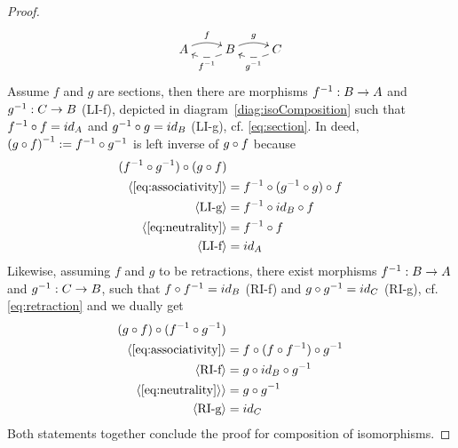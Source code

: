 \begin{proof}
\begin{equation}
\label{diag:isoComposition}
\xymatrix{
A \ar@/^/[r]^f & B \ar@/^/[r]^g \ar@{-->}@/^/[l]^{f^{-1}} & C  \ar@{-->}@/^/[l]^{g^{-1}}
}
\end{equation}
Assume $f$ and $g$ are sections, then there are morphisms $\arrow{B}{\inverse{f}}{A}$ and $\arrow{C}{\inverse{g}}{B}$ (LI-f), depicted in diagram~\ref{diag:isoComposition} such that $\compose{f}{\inverse{f}} = id_A$ and $\compose{g}{\inverse{g}} = id_B$ (LI-g), cf. \ref{eq:section}. 
In deed, $\inverse{(\compose{f}{g})} := \compose{\inverse{g}}{\inverse{f}}$ is left inverse of $\compose{f}{g}$ because
\begin{align*}
\compose{(\compose{f}{g})}{(\compose{\inverse{g}}{\inverse{f}})}  & \\
\proofStep{\ref{eq:associativity}} & = \compose{\compose{f}{(\compose{g}{\inverse{g}})}}{\inverse{f}}\\ 
\proofStep{LI-g}  & =   \compose{\compose{f}{\identity{B}}}{\inverse{f}} \\ 
\proofStep{\ref{eq:neutrality}} & =  \compose{f}{\inverse{f}} \\ 
\proofStep{LI-f} & = \identity{A}
\end{align*}
Likewise, assuming $f$ and $g$ to be retractions, there exist morphisms $\arrow{B}{\inverse{f}}{A}$ and $\arrow{C}{\inverse{g}}{B}$, such that $\compose{\inverse{f}}{f} = \identity{B}$ (RI-f) and $\compose{\inverse{g}}{g} = \identity{C}$ (RI-g), cf. \ref{eq:retraction} and we dually get
\begin{align*}
\compose{(\compose{\inverse{g}}{\inverse{f}})}{(\compose{f}{g})} & \\
\proofStep{\ref{eq:associativity}}	& = \compose{\inverse{g}}{\compose{(\compose{\inverse{f}}{f})}{f}} \\ 
\proofStep{RI-f} & =  \compose{\inverse{g}}{\compose{\identity{B}}{g}} \\ 
\proofStep{\ref{eq:neutrality}} \rangle & =  \compose{\inverse{g}}{g}  \\ 
\langle \mbox{RI-g} \rangle& = \identity{C}
\end{align*}
Both statements together conclude the proof for composition of isomorphisms.
\end{proof}


